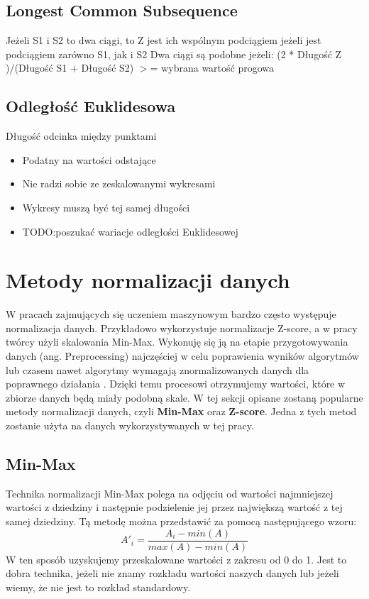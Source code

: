 \subsection{Longest Common Subsequence}
Jeżeli S1 i S2 to dwa ciągi, to Z jest ich wspólnym podciągiem jeżeli jest podciągiem zarówno S1, jak i S2
Dwa ciągi są podobne jeżeli:
(2 * Długość Z )/(Długość S1 + Długość S2) $>$= wybrana wartość progowa 

\subsection{Odległość Euklidesowa}
 Długość odcinka między punktami
\begin{itemize}
    \item Podatny na wartości odstające
    \item Nie radzi sobie ze zeskalowanymi wykresami
    \item Wykresy muszą być tej samej długości
    \item TODO:poszukać wariacje odległości Euklidesowej
\end{itemize}

\section{Metody normalizacji danych}

W pracach zajmujących się uczeniem maszynowym bardzo często występuje normalizacja danych. Przykładowo \cite{RuntimeEstimationALICE} wykorzystuje normalizacje Z-score, a w pracy \cite{BigDataParallelism} twórcy użyli skalowania Min-Max. Wykonuję się ją na etapie przygotowywania danych (ang. Preprocessing) najczęściej w celu poprawienia wyników algorytmów lub czasem nawet algorytmy wymagają znormalizowanych danych dla poprawnego działania \cite{standarization_effects}. Dzięki temu procesowi otrzymujemy wartości, które w zbiorze danych będą miały podobną skale.  W tej sekcji opisane zostaną popularne metody normalizacji danych, czyli \textbf{Min-Max} oraz \textbf{Z-score}. Jedna z tych metod zostanie użyta na danych wykorzystywanych w tej pracy.

\subsection{Min-Max}
Technika normalizacji Min-Max polega na odjęciu od wartości najmniejszej wartości z dziedziny i następnie podzielenie jej przez największą wartość z tej samej dziedziny. Tą metodę można przedstawić za pomocą następującego wzoru: 
\begin{equation}
\label{eqn:minmax}
A'_i = \frac{A_i-min(A)}{max(A) - min(A)}
\end{equation}
W ten sposób uzyskujemy przeskalowane wartości z zakresu od 0 do 1. Jest to dobra technika, jeżeli nie znamy rozkładu wartości naszych danych lub jeżeli wiemy, że nie jest to rozkład standardowy.


